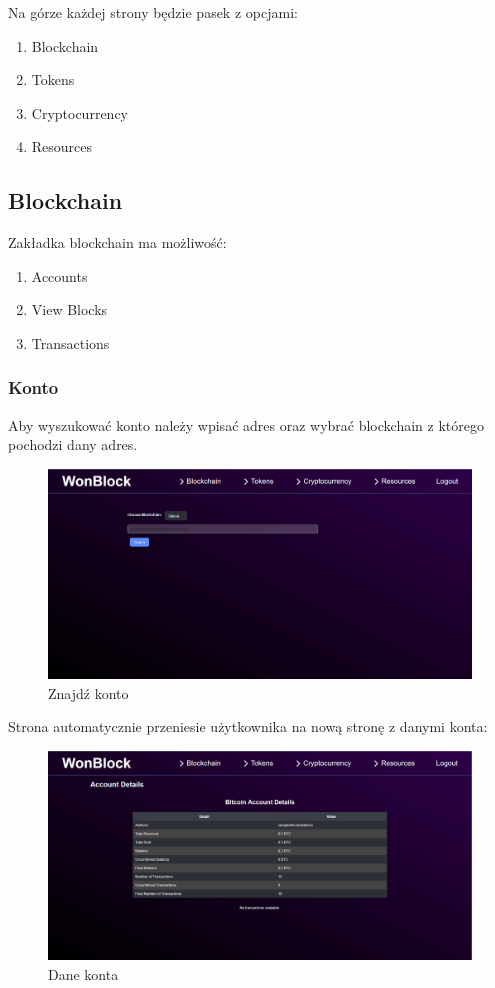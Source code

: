 Na górze każdej strony będzie pasek z opcjami:
\begin{enumerate}
    \item Blockchain
    \item Tokens
    \item Cryptocurrency
    \item Resources
\end{enumerate}
\subsection{Blockchain}
Zakładka blockchain ma możliwość:
\begin{enumerate}
    \item Accounts
    \item View Blocks
    \item Transactions
\end{enumerate}
\subsubsection{Konto}
Aby wyszukować konto należy wpisać adres oraz wybrać blockchain z którego pochodzi dany adres.
\begin{figure}[htb]
    \centering
    \includegraphics[width=0.8\linewidth]{./instrukcja/Check_account.png}
    \caption{Znajdź konto}
    \label{fig:Znajdź konto}
\end{figure}

Strona automatycznie przeniesie użytkownika na nową stronę z danymi konta:
\begin{figure}[htb]
    \centering
    \includegraphics[width=0.8\linewidth]{./instrukcja/Account_details.png}
    \caption{Dane konta}
    \label{fig:Dane konta}
\end{figure}

